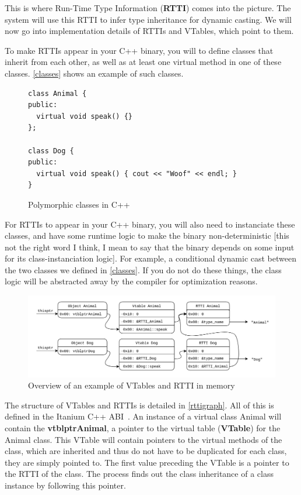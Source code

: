 \documentclass[a4paper,11pt,oneside]{report}
\begin{document}
This is where Run-Time Type Information (\textbf{RTTI}) comes into the picture.
The system will use this RTTI to infer type inheritance for dynamic casting.
We will now go into implementation details of RTTIs and VTables, which point to them.

To make RTTIs appear in your C++ binary, you will to define classes that inherit from each other, as well as at least one virtual method in one of these classes.
\autoref{classes} shows an example of such classes.

\begin{figure}[h]
\begin{lstlisting}
class Animal {
public:
  virtual void speak() {}
};

class Dog {
public:
  virtual void speak() { cout << "Woof" << endl; }
}
\end{lstlisting}
\caption{Polymorphic classes in C++}
\label{classes}

\end{figure}

For RTTIs to appear in your C++ binary, you will also need to instanciate these classes, and have some runtime logic to make the binary non-deterministic [this not the right word I think, I mean to say that the binary depends on some input for its class-instanciation logic].
For example, a conditional dynamic cast between the two classes we defined in \autoref{classes}.
If you do not do these things, the class logic will be abstracted away by the compiler for optimization reasons.

\begin{figure}[h]

\includegraphics[width=16cm]{RTTI_graph.png}
\caption{Overview of an example of VTables and RTTI in memory}
\label{rttigraph}

\end{figure}

The structure of VTables and RTTIs is detailed in \autoref{rttigraph}.
All of this is defined in the Itanium C++ ABI~\cite{cppabi}.
An instance of a virtual class Animal will contain the \textbf{vtblptrAnimal}, a pointer to the virtual table (\textbf{VTable}) for the Animal class.
This VTable will contain pointers to the virtual methods of the class, which are inherited and thus do not have to be duplicated for each class, they are simply pointed to.
The first value preceding the VTable is a pointer to the RTTI of the class. The process finds out the class inheritance of a class instance by following this pointer.
\end{document}
